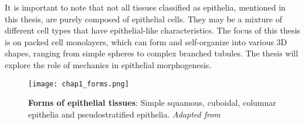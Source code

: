 It is important to note that not all tissues classified as epithelia, mentioned in this thesis, are purely composed of epithelial cells. They may be a mixture of different cell types that have epithelial-like characteristics. The focus of this thesis is on packed cell monolayers, which can form and self-organize into various 3D shapes, ranging from simple spheres to complex branched tubules. The thesis will explore the role of mechanics in epithelial morphogenesis.

\begin{figure}[H]
	\centering
	\texttt{[image: chap1\_forms.png]}
	\caption{\label{fig_1_5} \textbf{Forms of epithelial tissues}: Simple squamous, cuboidal, columnar epithelia and pseudostratified epithelia. \textit{Adapted from \cite{zotero-9680}}}
\end{figure}
